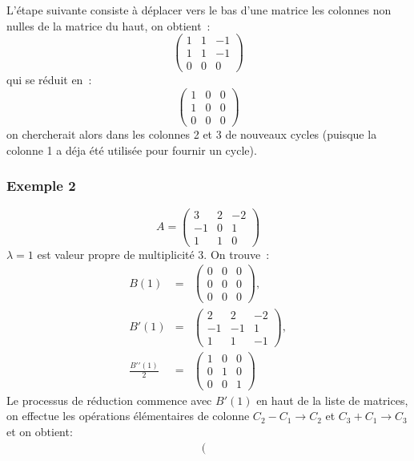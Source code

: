 \documentclass[a4paper,11pt]{article}
\begin{document}
\begin{giacjshere}
L'\'etape suivante consiste \`a d\'eplacer vers le bas d'une matrice les
colonnes non nulles de la matrice du haut, on obtient~:
\[ \left(\begin{array}{ccc}
 1 & 1 & -1 \\
1 & 1 & -1\\
0 & 0 & 0 
\end{array}\right) \]
qui se r\'eduit en~:
\[ \left(\begin{array}{ccc}
 1 & 0 & 0 \\
1 & 0 & 0\\
0 & 0 & 0 
\end{array}\right) \]
on chercherait alors dans les colonnes 2 et 3 de nouveaux cycles (puisque
la colonne 1 a d\'eja \'et\'e utilis\'ee pour fournir un cycle).

\subsubsection{Exemple 2} \label{sec:ex2}
\[ A=\left(\begin{array}{ccc}
 3 & 2 & -2 \\
-1 &0 &1 \\
1 & 1 & 0 
\end{array}\right) \]
$\lambda =1$ est valeur propre de multiplicit\'e 3.
On trouve~:
\begin{eqnarray*}
B(1)&=&
\left(\begin{array}{ccc}
0 & 0 & 0 \\
0 & 0 & 0 \\
0 & 0 & 0 
\end{array}\right), \\
B'(1)&=&\left(\begin{array}{ccc}
2 & 2&-2 \\
-1 & -1 & 1 \\
1 & 1 & -1 
\end{array}\right), \\
\frac{ B'{'}(1)}{2}
&=& \left(\begin{array}{ccc}
1 & 0 & 0 \\
0 & 1 & 0 \\
0 & 0 & 1 
\end{array}\right)
\end{eqnarray*}
Le processus de r\'eduction commence avec $B'(1)$ en haut de la liste
de matrices, on effectue les op\'erations \'el\'ementaires de
colonne $C_2-C_1\rightarrow C_2$
et $C_3+C_1 \rightarrow C_3$ et on obtient:
\begin{eqnarray*}
\left(\begin{array}{ccc}

\end{array}
\end{eqnarray*}
\end{giacjshere}
\end{document}
